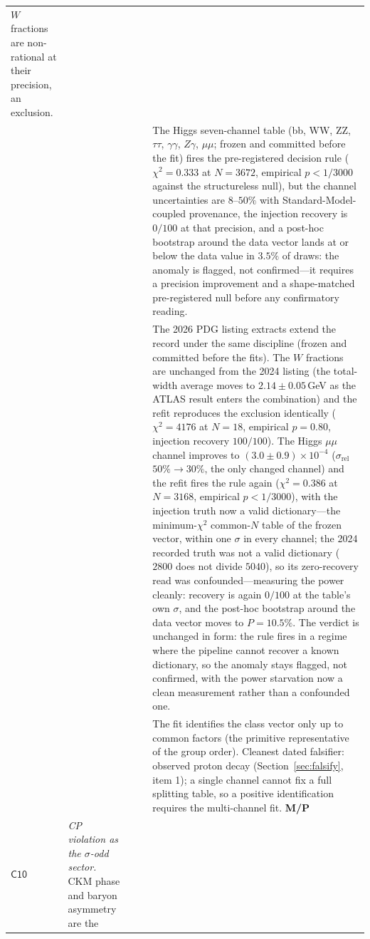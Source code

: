 \begin{longtable}{@{}p{}p{}p{}p{}p{}@{}}
$W$ fractions are non-rational at their precision, an exclusion.\\
 & & & & The Higgs seven-channel
table (bb, WW, ZZ, $\tau\tau$, $\gamma\gamma$, $Z\gamma$, $\mu\mu$; frozen and committed
before the fit) fires the pre-registered decision rule ($\chi^{2}=0.333$ at $N=3672$,
empirical $p<1/3000$ against the structureless null), but the channel uncertainties are
$8$--$50\%$ with Standard-Model-coupled provenance, the injection recovery is $0/100$ at
that precision, and a post-hoc bootstrap around the data vector lands at or below the
data value in $3.5\%$ of draws: the anomaly is flagged, not confirmed---it requires a
precision improvement and a shape-matched pre-registered null before any confirmatory
reading.\\
 & & & & The 2026 PDG listing extracts extend the record under the
same discipline (frozen and committed before the fits). The $W$ fractions
are unchanged from the 2024 listing (the total-width average moves to
$2.14\pm0.05$\,GeV as the ATLAS result enters the combination) and the
refit reproduces the exclusion identically ($\chi^{2}=4176$ at $N=18$,
empirical $p=0.80$, injection recovery $100/100$). The Higgs $\mu\mu$
channel improves to $(3.0\pm0.9)\times10^{-4}$ ($\sigma_{\mathrm{rel}}$
$50\%\to30\%$, the only changed channel) and the refit fires the rule
again ($\chi^{2}=0.386$ at $N=3168$, empirical $p<1/3000$), with the
injection truth now a valid dictionary---the minimum-$\chi^{2}$
common-$N$ table of the frozen vector, within one $\sigma$ in every
channel; the 2024 recorded truth was not a valid dictionary ($2800$ does
not divide $5040$), so its zero-recovery read was confounded---measuring
the power cleanly: recovery is again $0/100$ at the table's own
$\sigma$, and the post-hoc bootstrap around the data vector moves to
$P=10.5\%$. The verdict is unchanged in form: the rule fires in a
regime where the pipeline cannot recover a known dictionary, so the
anomaly stays flagged, not confirmed, with the power starvation now a
clean measurement rather than a confounded one.\\
 & & & & The fit identifies the class vector only up to common
factors (the primitive representative of the group order). Cleanest dated falsifier:
observed proton decay
(Section~\ref{sec:falsify}, item 1); a single channel cannot fix a full splitting table, so
a positive identification requires the multi-channel fit. \textbf{M/P}\\
$\mathsf{C10}$ &
\emph{CP violation as the $\sigma$-odd sector.} CKM phase and baryon asymmetry are the

\end{longtable}
